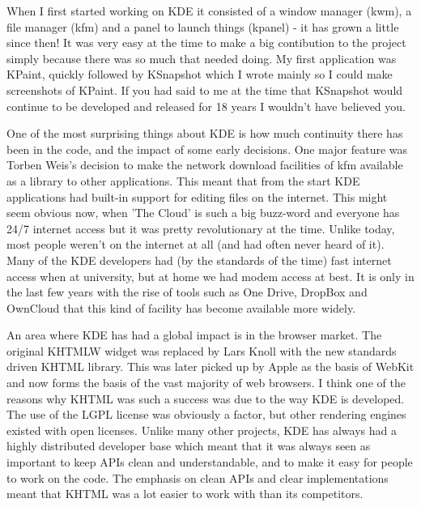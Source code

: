 ﻿


When I first started working on KDE it consisted of a window manager (kwm), a file manager (kfm) and a panel to launch things (kpanel) - it has grown a little since then! It was very easy at the time to make a big contibution to the project simply because there was so much that needed doing. My first application was KPaint, quickly followed by KSnapshot which I wrote mainly so I could make screenshots of KPaint. If you had said to me at the time that KSnapshot would continue to be developed and released for 18 years I wouldn't have believed you.

One of the most surprising things about KDE is how much continuity there has been in the code, and the impact of some early decisions. One major feature was Torben Weis's decision to make the network download facilities of kfm available as a library to other applications. This meant that from the start KDE applications had built-in support for editing files on the internet. This might seem obvious now, when 'The Cloud' is such a big buzz-word and everyone has 24/7 internet access but it was pretty revolutionary at the time. Unlike today, most people weren't on the internet at all (and had often never heard of it). Many of the KDE developers had (by the standards of the time) fast internet access when at university, but at home we had modem access at best. It is only in the last few years with the rise of tools such as One Drive, DropBox and OwnCloud that this kind of facility has become available more widely.

An area where KDE has had a global impact is in the browser market. The original KHTMLW widget was replaced by Lars Knoll with the new standards driven KHTML library. This was later picked up by Apple as the basis of WebKit and now forms the basis of the vast majority of web browsers. I think one of the reasons why KHTML was such a success was due to the way KDE is developed. The use of the LGPL license was obviously a factor, but other rendering engines existed with open licenses. Unlike many other projects, KDE has always had a highly distributed developer base which meant that it was always seen as important to keep APIs clean and understandable, and to make it easy for people to work on the code. The emphasis on clean APIs and clear implementations meant that KHTML was a lot easier to work with than its competitors.

